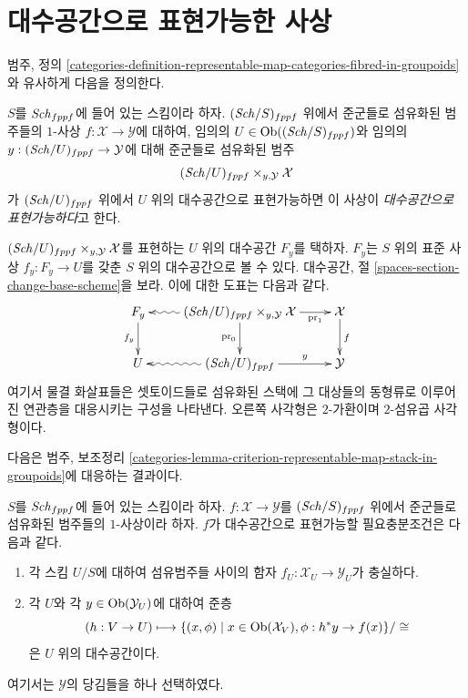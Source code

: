 \section{대수공간으로 표현가능한 사상}
\label{section-morphisms-representable-by-algebraic-spaces}

\noindent
범주, 정의
\ref{categories-definition-representable-map-categories-fibred-in-groupoids}와
유사하게 다음을 정의한다.

\begin{definition}
\label{definition-representable-by-algebraic-spaces}
$S$를 $\mathit{Sch}_{fppf}$에 들어 있는 스킴이라 하자. $(\mathit{Sch}/S)_{fppf}$
위에서 준군들로 섬유화된 범주들의 $1$-사상
$f : \mathcal{X} \to \mathcal{Y}$에 대하여, 임의의
$U \in \mathop{\mathrm{Ob}}\nolimits((\mathit{Sch}/S)_{fppf})$와 임의의
$y : (\mathit{Sch}/U)_{fppf} \to \mathcal{Y}$에 대해 준군들로 섬유화된 범주
$$
(\mathit{Sch}/U)_{fppf} \times_{y, \mathcal{Y}} \mathcal{X}
$$
가 $(\mathit{Sch}/U)_{fppf}$ 위에서 $U$ 위의 대수공간으로 표현가능하면 이
사상이 {\it 대수공간으로 표현가능하다}고 한다.
\end{definition}

\noindent
$(\mathit{Sch}/U)_{fppf} \times_{y, \mathcal{Y}} \mathcal{X}$를 표현하는
$U$ 위의 대수공간 $F_y$를 택하자. $F_y$는 $S$ 위의 표준 사상
$f_y : F_y \to U$를 갖춘 $S$ 위의 대수공간으로 볼 수 있다.
대수공간, 절 \ref{spaces-section-change-base-scheme}을 보라. 이에 대한
도표는 다음과 같다.
\begin{equation}
\label{equation-representable-by-algebraic-spaces}
\vcenter{
\xymatrix{
F_y \ar[d]_{f_y} &
(\Sch/U)_{fppf} \times_{y, \mathcal{Y}} \mathcal{X}
\ar@{~>}[l] \ar[d]_{\text{pr}_0} \ar[r]_-{\text{pr}_1} &
\mathcal{X} \ar[d]^f \\
U &
(\Sch/U)_{fppf} \ar@{~>}[l] \ar[r]^-y &
\mathcal{Y}
}
}
\end{equation}
여기서 물결 화살표들은 셋토이드들로 섬유화된 스택에 그 대상들의 동형류로
이루어진 연관층을 대응시키는 구성을 나타낸다. 오른쪽 사각형은
$2$-가환이며 $2$-섬유곱 사각형이다.

\medskip\noindent
다음은 범주, 보조정리
\ref{categories-lemma-criterion-representable-map-stack-in-groupoids}에
대응하는 결과이다.

\begin{lemma}
\label{lemma-criterion-map-representable-spaces-fibred-in-groupoids}
$S$를 $\mathit{Sch}_{fppf}$에 들어 있는 스킴이라 하자.
$f : \mathcal{X} \to \mathcal{Y}$를 $(\mathit{Sch}/S)_{fppf}$ 위에서
준군들로 섬유화된 범주들의 $1$-사상이라 하자. $f$가 대수공간으로
표현가능할 필요충분조건은 다음과 같다.
\begin{enumerate}
\item 각 스킴 $U/S$에 대하여 섬유범주들 사이의 함자
$f_U : \mathcal{X}_U \longrightarrow \mathcal{Y}_U$가 충실하다.
\item 각 $U$와 각 $y \in \mathop{\mathrm{Ob}}\nolimits(\mathcal{Y}_U)$에 대하여 준층
$$
(h : V \to U)
\longmapsto
\{(x, \phi) \mid x \in \mathop{\mathrm{Ob}}\nolimits(\mathcal{X}_V), \phi : h^*y \to f(x)\}/\cong
$$
은 $U$ 위의 대수공간이다.
\end{enumerate}
여기서는 $\mathcal{Y}$의 당김들을 하나 선택하였다.
\end{lemma}

